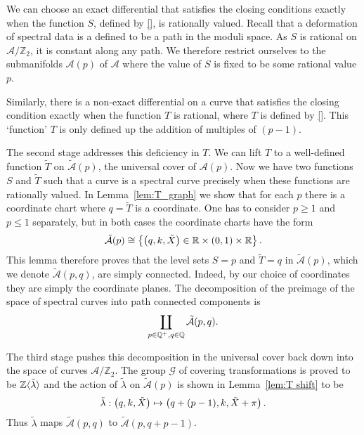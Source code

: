 \documentclass{article}
\begin{document}
We can choose an exact differential that satisfies the closing conditions exactly when the function $S$, defined by \eqref{}, is rationally valued.
Recall that a deformation of spectral data is a defined to be a path in the moduli space.
As $S$ is rational on $\mathcal{A}/\mathbb{Z}_2$, it is constant along any path. We therefore restrict ourselves to the submanifolds $\mathcal{A}(p)$ of $\mathcal{A}$ where the value of $S$ is fixed to be some rational value $p$.

Similarly, there is a non-exact differential on a curve that satisfies the closing condition exactly when the function $T$ is rational, where $T$ is defined by \ref{}. This `function' $T$ is only defined up the addition of multiples of $(p-1)$. %

The second stage addresses this deficiency in $T$. We can lift $T$ to a well-defined function $\tilde{T}$ on $\mathcal{\tilde{A}}(p)$, the universal cover of $\mathcal{A}(p)$. Now we have two functions $S$ and $\tilde{T}$ such that a curve is a spectral curve precisely when these functions are rationally valued. In Lemma~\ref{lem:T_graph} we show that for each $p$ there is a coordinate chart where $q=\tilde{T}$ is a coordinate. One has to consider $p \geq 1$ and $p \leq 1$ separately, but in both cases the coordinate charts have the form 
\[
\mathcal{\tilde{A}}(p) \cong \left\{ \left(q,k,\tilde{X}\right) \in \mathbb{R} \times (0,1) \times \mathbb{R} \right\}.
\]
This lemma therefore proves that the level sets $S = p$ and $\tilde{T} = q$ in $\mathcal{\tilde{A}}(p)$, which we denote $\mathcal{\tilde{A}}(p,q)$, are simply connected. Indeed, by our choice of coordinates they are simply the coordinate planes. The decomposition of the preimage of the space of spectral curves into path connected components is
\[
\coprod_{p \in \mathbb{Q}^+, q\in\mathbb{Q}} \mathcal{\tilde{A}}(p,q).
\]

The third stage pushes this decomposition in the universal cover back down into the space of curves $\mathcal{A}/\mathbb{Z}_2$.
The group $\mathcal{G}$ of covering transformations is proved to be $\mathbb{Z}\langle \tilde{\lambda} \rangle$ and the action of $\tilde{\lambda}$ on $\mathcal{\tilde{A}}(p)$ is shown in Lemma~\ref{lem:T shift} to be
\[
\tilde{\lambda} : \left(q,k,\tilde{X}\right) \mapsto \left(q + (p-1),k,\tilde{X} + \pi\right).
\]
Thus $\tilde{\lambda}$ maps $\mathcal{\tilde{A}}(p,q)$ to $\mathcal{\tilde{A}}(p,q + p-1)$. 
\end{document}

